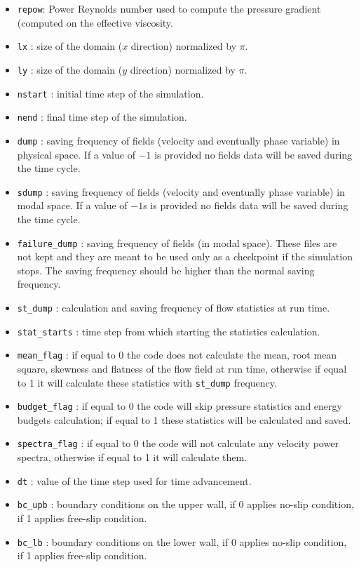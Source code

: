 \begin{itemize}
\item \texttt{repow}: Power Reynolds number used to compute the pressure gradient (computed on the effective viscosity.
\item \texttt{lx} : size of the domain ($x$ direction) normalized by $\pi$.
\item \texttt{ly} : size of the domain ($y$ direction) normalized by $\pi$.
\item \texttt{nstart} : initial time step of the simulation.
\item \texttt{nend} : final time step of the simulation.
\item \texttt{dump} : saving frequency of fields (velocity and eventually phase variable) in physical space. If a value of $-1$ is provided no fields data will be saved during the time cycle.
\item \texttt{sdump} : saving frequency of fields (velocity and eventually phase variable) in modal space. If a value of $-1$s is provided no fields data will be saved during the time cycle.
\item \texttt{failure\_dump} : saving frequency of fields (in modal space). These files are not kept and they are meant to be used only as a checkpoint if the simulation stops. The saving frequency should be higher than the normal saving frequency.
\item \texttt{st\_dump} : calculation and saving frequency of flow statistics at run time.
\item \texttt{stat\_starts} : time step from which starting the statistics calculation.
\item \texttt{mean\_flag} : if equal to 0 the code does not calculate the mean, root mean square, skewness and flatness of the flow field at run time, otherwise if equal to 1 it will calculate these statistics with \texttt{st\_dump} frequency.
\item \texttt{budget\_flag} : if equal to 0 the code will skip pressure statistics and energy budgets calculation; if equal to 1 these statistics will be calculated and saved.
\item \texttt{spectra\_flag} : if equal to 0 the code will not calculate any velocity power spectra, otherwise if equal to 1 it will calculate them.
\item \texttt{dt} : value of the time step used for time advancement.
\item \texttt{bc\_upb} : boundary conditions on the upper wall, if 0 applies no-slip condition, if 1 applies free-slip condition.
\item \texttt{bc\_lb} : boundary conditions on the lower wall, if 0 applies no-slip condition, if 1 applies free-slip condition.

\end{itemize}
